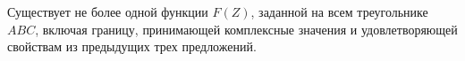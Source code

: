 \begin{theorem} \label{3.5} 
Существует не более одной функции $F(Z)$, заданной на всем треугольнике $ABC$, включая границу, принимающей комплексные значения и удовлетворяющей свойствам
из предыдущих трех предложений.
\end{theorem}